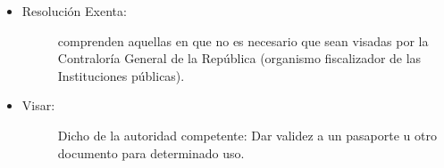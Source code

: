 \begin{itemize}
	\item 	\begin{description}
			    \item[Resolución Exenta:] comprenden aquellas en que no es necesario que sean visadas por la Contraloría General de la República (organismo fiscalizador de las Instituciones públicas). \cite{3}
			\end{description}

	\item 	\begin{description}
			    \item[Visar:] Dicho de la autoridad competente: Dar validez a un pasaporte u otro documento para determinado uso.\cite{4}
			\end{description} 

\end{itemize}


